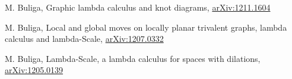 \documentclass{article}
\begin{document}
\begin{thebibliography}{99}

 M. Buliga, Graphic lambda calculus and knot diagrams, \href{http://arxiv.org/abs/1211.1604}{arXiv:1211.1604}


 M. Buliga, Local and global moves on locally planar trivalent graphs, lambda calculus and lambda-Scale, \href{http://arxiv.org/abs/1207.0332}{arXiv:1207.0332} 

 M. Buliga, Lambda-Scale, a lambda calculus for spaces with dilations,  \href{http://arxiv.org/abs/1205.0139}{arXiv:1205.0139}
\end{thebibliography}
\end{document}
